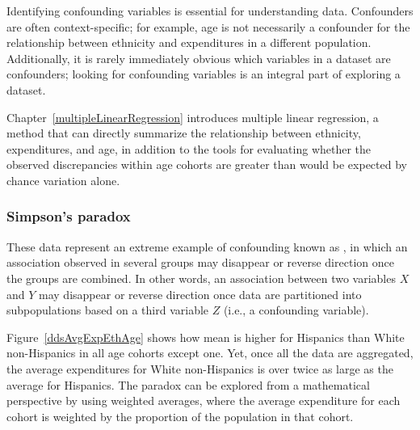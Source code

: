 Identifying confounding variables is essential for understanding data. Confounders are often context-specific; for example, age is not necessarily a confounder for the relationship between ethnicity and expenditures in a different population. Additionally, it is rarely immediately obvious which variables in a dataset are confounders; looking for confounding variables is an integral part of exploring a dataset.

Chapter~\ref{multipleLinearRegression} introduces multiple linear regression, a method that can directly summarize the relationship between ethnicity, expenditures, and age, in addition to the tools for evaluating whether the observed discrepancies within age cohorts are greater than would be expected by chance variation alone.

\subsubsection{Simpson's paradox}

These data represent an extreme example of confounding known as , in which an association observed in several groups may disappear or reverse direction once the groups are combined. In other words, an association between two variables $X$ and $Y$ may disappear or reverse direction once data are partitioned into subpopulations based on a third variable $Z$ (i.e., a confounding variable).

Figure~\ref{ddsAvgExpEthAge} shows how mean  is higher for Hispanics than White non-Hispanics in all age cohorts except one. Yet, once all the data are aggregated, the average expenditures for White non-Hispanics is over twice as large as the average for Hispanics. The paradox can be explored from a mathematical perspective by using weighted averages, where the average expenditure for each cohort is weighted by the proportion of the population in that cohort.

